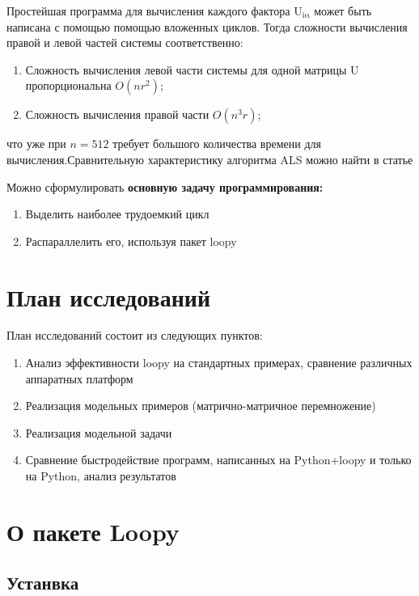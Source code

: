 \documentclass{scrartcl}
\begin{document}
Простейшая программа для вычисления каждого фактора U$_{\mathrm{i \alpha}}$ может быть написана с помощью
помощью вложенных циклов. Тогда сложности вычисления правой и левой частей системы соответственно:
\begin{enumerate}
\item Сложность вычисления левой части системы для одной матрицы U пропорциональна $O(nr^2)$;
\item Сложность вычисления правой части $O (n^3r)$;
\end{enumerate}

что уже при $n=512$ требует большого количества времени для вычисления.Сравнительную характеристику алгоритма ALS можно найти в статье \cite{faber2003recent}

Можно сформулировать \bfseries основную задачу программирования:

\begin{enumerate}
\item Выделить наиболее трудоемкий цикл
\item Распараллелить его, используя пакет loopy
\end{enumerate}
\mdseries
\section{План исследований}
\label{sec-6}

План исследований состоит из следующих пунктов:
\begin{enumerate}
\item Анализ эффективности loopy на стандартных примерах, сравнение различных аппаратных платформ
\item Реализация модельных примеров (матрично-матричное перемножение)
\item Реализация модельной задачи
\item Сравнение быстродействие программ, написанных на Python+loopy и только на Python, анализ результатов
\end{enumerate}
\section{О пакете Loopy}
\label{sec-7}
\subsection{Устанвка}
\label{sec-7-1}
\end{document}
